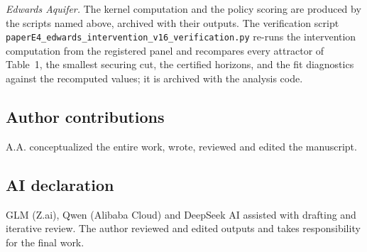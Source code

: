 \documentclass[11pt]{article}
\begin{document}
\emph{Edwards Aquifer.} The kernel computation and the policy scoring are produced by the scripts
named above, archived with their outputs. The verification script
\texttt{paperE4\_edwards\_intervention\_v16\_verification.py} re-runs
the intervention computation from the registered panel and recompares
every attractor of Table~1, the smallest securing cut, the certified
horizons, and the fit diagnostics against the recomputed values; it is
archived with the analysis code.

\subsection*{Author contributions}
A.A. conceptualized the entire work, wrote, reviewed and edited the manuscript.

\subsection*{AI declaration}
GLM (Z.ai), Qwen (Alibaba Cloud) and DeepSeek AI assisted with drafting
and iterative review. The author reviewed and edited outputs and takes
responsibility for the final work.
\end{document}

